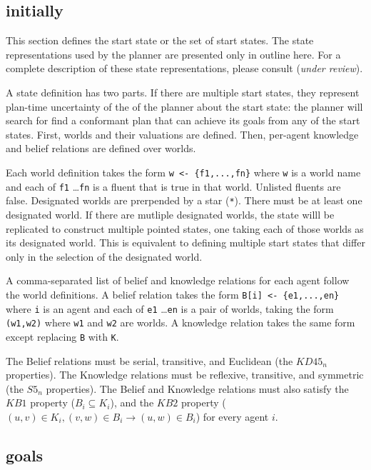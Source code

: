 \documentclass{article}
\newcommand{\kdff}{\ensuremath{KD45_n}}
\newcommand{\sfive}{\ensuremath{S5_n}}
\newcommand{\kbone}{\ensuremath{KB1}}
\newcommand{\kbtwo}{\ensuremath{KB2}}
\begin{document}
\subsection{initially}

This section defines the start state or the set of start states.
The state representations used by the planner are presented only in outline
here. For a complete description of these state representations, please
consult  (\emph{under review}). 

A state definition has two parts.
If there are multiple start states, they represent
plan-time uncertainty of the of the planner about the start state: the planner
will search for find a conformant plan that can achieve its goals from any of
the start states.
First, worlds and their valuations are
defined. Then, per-agent knowledge and belief relations are defined over worlds.

Each world definition takes the form
\verb|w <- {f1,...,fn}|
where \verb|w| is a world name
and each of \verb|f1| \ldots \verb|fn| is a fluent 
that is true in that world. Unlisted fluents are false.
Designated worlds are prerpended by a star (\verb|*|).
There must be at least one designated world. 
If there are mutliple designated worlds, the state willl be replicated to
construct multiple pointed states, one taking each of those worlds as its
designated world. This is equivalent to defining multiple start states that
differ only in the selection of the designated world.

A comma-separated list of belief and knowledge relations for each agent follow the world definitions.
A belief relation takes the form
\verb|B[i] <- {e1,...,en}|
where \verb|i| is an agent
and each of \verb|e1| \ldots \verb|en| is a pair of worlds, taking the
form \verb|(w1,w2)| where \verb|w1| and \verb|w2| are worlds.
A knowledge relation takes the same form except replacing \verb|B| with \verb|K|.

The Belief relations must be serial, transitive, and Euclidean (the \kdff{}
properties). The Knowledge relations must be reflexive, transitive, and
symmetric (the \sfive{} properties). The Belief and Knowledge relations must also
satisfy the \kbone{} property ($B_i \subseteq K_i$), and the \kbtwo{} property
($(u,v) \in K_i, (v,w) \in B_i \rightarrow (u,w) \in B_i$) for every agent
$i$.



\subsection{goals}
\end{document}
